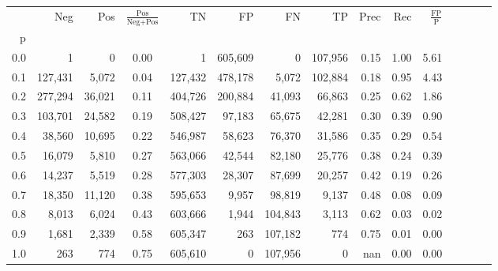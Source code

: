 \begin{tabular}{rrrcrrrrrrrrrrr}
\toprule
{} &      Neg &     Pos & $\frac{\text{Pos}}{\text{Neg}+\text{Pos}}$ &       TN &       FP &       FN &       TP &  Prec &   Rec & $\frac{\text{FP}}{\text{P}}$ \\
p   &          &         &                                            &          &          &          &          &       &       &                              \\
\midrule
0.0 &        1 &       0 &                                       0.00 &        1 &  605,609 &        0 &  107,956 &  0.15 &  1.00 &                         5.61 \\
0.1 &  127,431 &   5,072 &                                       0.04 &  127,432 &  478,178 &    5,072 &  102,884 &  0.18 &  0.95 &                         4.43 \\
0.2 &  277,294 &  36,021 &                                       0.11 &  404,726 &  200,884 &   41,093 &   66,863 &  0.25 &  0.62 &                         1.86 \\
0.3 &  103,701 &  24,582 &                                       0.19 &  508,427 &   97,183 &   65,675 &   42,281 &  0.30 &  0.39 &                         0.90 \\
0.4 &   38,560 &  10,695 &                                       0.22 &  546,987 &   58,623 &   76,370 &   31,586 &  0.35 &  0.29 &                         0.54 \\
0.5 &   16,079 &   5,810 &                                       0.27 &  563,066 &   42,544 &   82,180 &   25,776 &  0.38 &  0.24 &                         0.39 \\
0.6 &   14,237 &   5,519 &                                       0.28 &  577,303 &   28,307 &   87,699 &   20,257 &  0.42 &  0.19 &                         0.26 \\
0.7 &   18,350 &  11,120 &                                       0.38 &  595,653 &    9,957 &   98,819 &    9,137 &  0.48 &  0.08 &                         0.09 \\
0.8 &    8,013 &   6,024 &                                       0.43 &  603,666 &    1,944 &  104,843 &    3,113 &  0.62 &  0.03 &                         0.02 \\
0.9 &    1,681 &   2,339 &                                       0.58 &  605,347 &      263 &  107,182 &      774 &  0.75 &  0.01 &                         0.00 \\
1.0 &      263 &     774 &                                       0.75 &  605,610 &        0 &  107,956 &        0 &   nan &  0.00 &                         0.00 \\
\bottomrule
\end{tabular}
